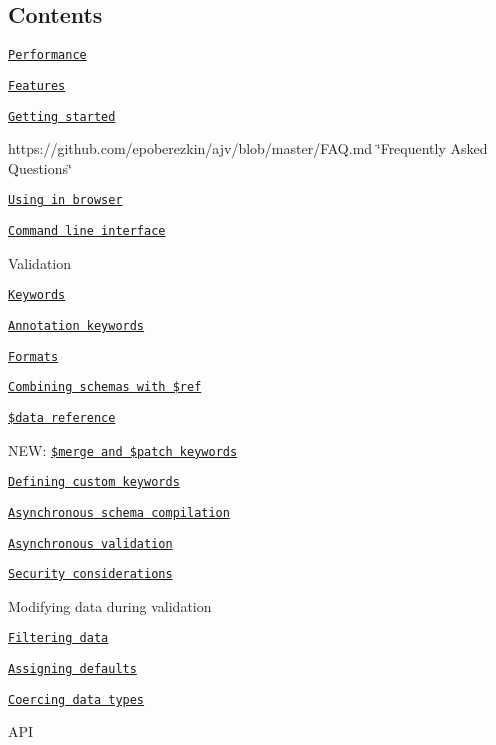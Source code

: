 \subsection*{Contents}


\begin{DoxyItemize}
\item \href{#performance}{\tt Performance}
\item \href{#features}{\tt Features}
\item \href{#getting-started}{\tt Getting started}
\item https\+://github.com/epoberezkin/ajv/blob/master/\+F\+A\+Q.\+md \char`\"{}\+Frequently Asked Questions\char`\"{}
\item \href{#using-in-browser}{\tt Using in browser}
\item \href{#command-line-interface}{\tt Command line interface}
\item Validation
\begin{DoxyItemize}
\item \href{#validation-keywords}{\tt Keywords}
\item \href{#annotation-keywords}{\tt Annotation keywords}
\item \href{#formats}{\tt Formats}
\item \href{#ref}{\tt Combining schemas with \$ref}
\item \href{#data-reference}{\tt \$data reference}
\item N\+EW\+: \href{#merge-and-patch-keywords}{\tt \$merge and \$patch keywords}
\item \href{#defining-custom-keywords}{\tt Defining custom keywords}
\item \href{#asynchronous-schema-compilation}{\tt Asynchronous schema compilation}
\item \href{#asynchronous-validation}{\tt Asynchronous validation}
\item \href{#security-considerations}{\tt Security considerations}
\end{DoxyItemize}
\item Modifying data during validation
\begin{DoxyItemize}
\item \href{#filtering-data}{\tt Filtering data}
\item \href{#assigning-defaults}{\tt Assigning defaults}
\item \href{#coercing-data-types}{\tt Coercing data types}
\end{DoxyItemize}
\item A\+PI

\end{DoxyItemize}
